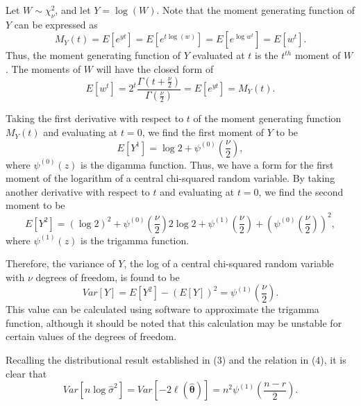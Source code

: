 \documentclass[sn-mathphys-ay]{sn-jnl}
\begin{document}
Let $W \sim \chi^2_{\nu}$, and let $Y = \log(W)$. Note that the moment generating function of $Y$ can be expressed as
\begin{equation*}
	M_Y (t) = E \left[ e^{yt} \right] = E \left[ e^{t\log(w)} \right] = E \left[ e^{\log w^t} \right] = E \left[ w^t \right] .
\end{equation*}
Thus, the moment generating function of $Y$ evaluated at $t$ is the $t^{th}$ moment of $W$. The moments of $W$ will have the
closed form of
\begin{equation*}
	E \left[ w^t \right] = 2^t \frac{\Gamma (t + \frac{\nu}{2})}{\Gamma (\frac{\nu}{2})} = E \left[ e^{yt} \right] = M_Y (t) .
\end{equation*}

Taking the first derivative with respect to $t$ of the moment generating function $M_Y (t)$ and evaluating at $t=0$, we find the first moment of $Y$ to be
\begin{equation*}
	E \left[ Y^1 \right] =  \log 2 + \psi^{(0)} \left( \frac{\nu}{2} \right) ,
\end{equation*}
where $\psi^{(0)}(z)$ is the digamma function. Thus, we have a form for the first moment of the logarithm of a central chi-squared random variable. By taking another
derivative with respect to $t$ and evaluating at $t=0$, we find the second moment to be
\begin{equation*}
	E \left[ Y^2 \right] =
	(\log 2)^2 + \psi^{(0)} \left( \frac{\nu}{2} \right) 2 \log 2  + \psi^{(1)} \left( \frac{\nu}{2} \right) + \left( \psi^{(0)} \left( \frac{\nu}{2} \right) \right)^2 ,
\end{equation*}
where $\psi^{(1)}(z)$ is the trigamma function.

Therefore, the variance of $Y$, the log of a central chi-squared random variable with
$\nu$ degrees of freedom, is found to be
\begin{equation*}
	Var \left[ Y \right] = E \left[ Y^2 \right] - \left( E \left[ Y \right] \right)^2 = \psi^{(1)} \left( \frac{\nu}{2} \right) .
\end{equation*}
This value can be calculated using software to approximate the trigamma function, although it should be noted that this calculation may be unstable for certain values of the degrees of freedom.

Recalling the distributional result established in (3) and the relation in (4), it is clear that
\begin{equation*}
	Var \left[ n \log \hat{\sigma}^2 \right] = Var \left[ -2 \ell (\hat{\bm{\theta}} ) \right] = n^2 \psi^{(1)} \left( \frac{n-r}{2} \right).
\end{equation*}
\end{document}
